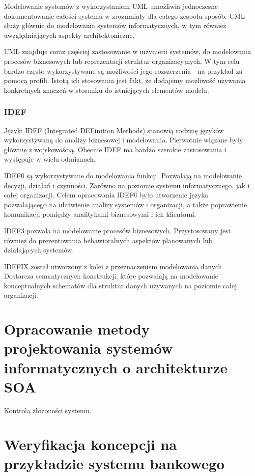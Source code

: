 Modelowanie systemów z wykorzystaniem UML umożliwia jednoczesne dokumentowanie całości systemu w zrozumiały dla całego zespołu sposób.\cite{PlatIntGor} UML służy głównie do modelowania systemów informatycznych, w tym również uwzględniających aspekty architektoniczne. 

UML znajduje coraz częściej zastosowanie w inżynierii systemów, do  modelowania procesów biznesowych lub reprezentacji struktur organizacyjnych. W tym celu bardzo często wykorzystywane są możliwości jego rozszerzenia - na przykład za pomocą profili. Istotą ich stosowania jest fakt, że dodajemy możliwość używania konkretnych znaczeń w stosunku do istniejących elementów modelu.


\subsection{IDEF}
Języki IDEF (Integrated DEFinition Methods) stanowią rodzinę języków wykorzystywaną do analizy biznesowej i modelowania. Pierwotnie wiązane były głównie z wojskowością.  Obecnie IDEF ma bardzo szerokie zastosowania i występuje w wielu odmianach.

IDEF0 są wykorzystywane do modelowania funkcji. Pozwalają na modelowanie decyzji, działań i czynności. Zarówno na poziomie systemu informatycznego, jak i całej organizacji. Celem opracowania IDEF0 było utworzenie języka pozwalającego na ułatwienie analizy systemów i organizacji, a także poprawienie komunikacji pomiędzy analitykami biznesowymi i ich klientami. 

IDEF3 pozwala na modelowanie procesów biznesowych. Przystosowany jest również do prezentowania behawioralnych aspektów planowanych lub działających systemów. 

IDEFIX został utworzony z kolei z przeznaczeniem modelowania danych. Dostarcza semantycznych konstrukcji, które pozwalają na modelowanie konceptualnych schematów dla struktur danych używanych na poziomie całej organizacji.

\chapter{Opracowanie metody projektowania systemów informatycznych o architekturze SOA}
Kontrola złożoności systemu.

\chapter{Weryfikacja koncepcji na przykładzie systemu bankowego}
